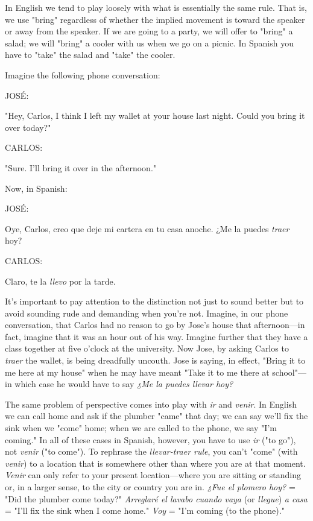 \documentclass[14pt,a4paper,oneside]{memoir}
\newcommand{\bsk}{\vspace{20pt}}
\newcommand{\inda}{\hspace{40pt}}
\newcommand{\indu}{\hspace{20pt}}
\begin{document}
In English we tend to play loosely with what is essentially the
same rule. That is, we use "bring" regardless of whether the implied
movement is toward the speaker or away from the speaker. If we are
going to a party, we will offer to "bring" a salad; we will "bring" a
cooler with us when we go on a picnic. In Spanish you have to "take"
the salad and "take" the cooler.

\bsk

Imagine the following phone conversation:

\bsk

\inda JOSÉ:

\indu "Hey, Carlos, I think I left my wallet at your house last night.
Could you bring it over today?"

\inda CARLOS:

\indu "Sure. I'll bring it over in the afternoon."

\bsk

Now, in Spanish:

\bsk

\inda JOSÉ:

\indu Oye, Carlos, creo que deje mi cartera en tu casa anoche. ¿Me la
puedes \emph{traer} hoy?

\inda CARLOS:

\indu Claro, te la \emph{llevo} por la tarde.

\bsk

It's important to pay attention to the distinction not just to
sound better but to avoid sounding rude and demanding when you're
not. Imagine, in our phone conversation, that Carlos had no reason
to go by Jose's house that afternoon---in fact, imagine that it was an
hour out of his way. Imagine further that they have a class together
at five o'clock at the university. Now Jose, by asking Carlos to \emph{traer}
the wallet, is being dreadfully uncouth. Jose is saying, in effect, "Bring
it to me here at my house" when he may have meant "Take it to me
there at school"---in which case he would have to say \emph{¿Me la puedes
	llevar hoy?}

The same problem of perspective comes into play with \emph{ir} and
\emph{venir}. In English we can call home and ask if the plumber "came" that
day; we can say we'll fix the sink when we "come" home; when we are
called to the phone, we say "I'm coming." In all of these cases in Spanish, however, you have to use \emph{ir} ("to go"), not \emph{venir} ("to come"). To
rephrase the \emph{llevar-traer rule}, you can't "come" (with \emph{venir}) to a location that is somewhere other than where you are at that moment.
\emph{Venir} can only refer to your present location---where you are sitting or
standing or, in a larger sense, to the city or country you are in. \emph{¿Fue el
	plomero hoy?} = "Did the plumber come today?" \emph{Arreglaré el lavabo
	cuando vaya} (or \emph{llegue}) \emph{a casa} = "I'll fix the sink when I come home."
\emph{Voy} = "I'm coming (to the phone)."
\end{document}
